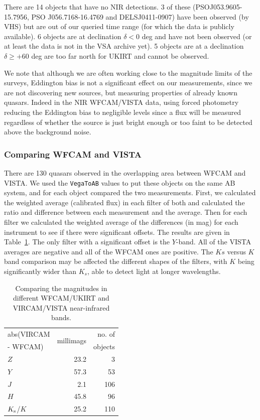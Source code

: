 \documentclass[usenatbib]{mnras}
\begin{document}
There are 14 objects that have no NIR detections. 3 of these
(PSOJ053.9605-15.7956, PSO J056.7168-16.4769 and DELSJ0411-0907) have
been observed (by VHS) but are out of our queried time range (for
which the data is publicly available). 6 objects are at declination
$\delta<0$ deg and have not been observed (or at least the data is not
in the VSA archive yet). 5 objects are at a declination $\delta \geq
+60$ deg are too far north for UKIRT and cannot be observed.

We note that although we are often working close to the magnitude
limits of the surveys, Eddington bias is not a significant effect on
our measurements, since we are not discovering new sources, but
measuring properties of already known quasars. Indeed in the NIR
WFCAM/VISTA data, using forced photometry reducing the Eddington bias
to negligible levels since a flux will be measured regardless of
whether the source is just bright enough or too faint to be detected
above the background noise.


  \subsubsection{Comparing WFCAM and VISTA}
  There are 130 quasars observed in the overlapping area between WFCAM
  and VISTA. We used the {\tt VegaToAB} values to put these objects on
  the same AB system, and for each object compared the two
  measurements. First, we calculated the weighted average (calibrated
  flux) in each filter of both and calculated the ratio and difference
  between each measurement and the average.  Then for each filter we
  calculated the weighted average of the differences (in mag) for each
  instrument to see if there were significant offsets. The results are
  given in Table~\ref{tab:WFCAM_vs_VISTA}.  The only filter with a
  significant offset is the $Y$-band. All of the VISTA averages are
  negative and all of the WFCAM ones are positive. The $Ks$ versus $K$
  band comparison may be affected the different shapes of the filters,
  with $K$ being significantly wider than $K_s$, able to detect light at
  longer wavelengths.
  \begin{table}
    \centering
    \begin{tabular}{l r r}
      \hline  \hline
      abs(VIRCAM & \multirow{2}{*}{millimags} &  no. of  \\
      -  WFCAM)      &                                        &  objects \\
      \hline
      $Z$                 &  23.2 	& 3 \\
      $Y$                 &  57.3 	& 53 \\
      $J$                  &    2.1 	& 106 \\
      $H$                 &  45.8     &  96 \\
      $K_{\rm s}$/$K$ &  25.2     & 110 \\
      \hline  \hline
    \end{tabular}
    \caption{Comparing the magnitudes in different WFCAM/UKIRT and 
      VIRCAM/VISTA near-infrared bands.}
    \label{tab:WFCAM_vs_VISTA}
  \end{table}
  
\end{document}
